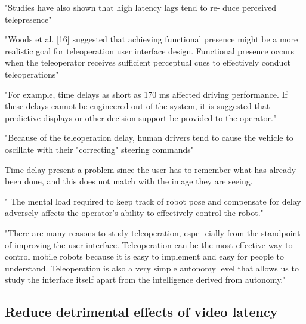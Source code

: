 "Studies have also shown that high latency lags tend to re-
duce perceived telepresence"

"Woods et al. [16] suggested that achieving functional presence might be a more realistic goal for teleoperation user interface design. Functional presence occurs when the teleoperator receives sufficient perceptual cues to effectively conduct teleoperations"

"For example, time delays as short as 170 ms affected driving performance. If these delays cannot be engineered out of the system, it is suggested that predictive displays or other decision support be provided to the operator."

\citep{Appelqvist2007} "Because of the teleoperation delay, human drivers
tend to cause the vehicle to oscillate with their "correcting" steering commands" 

Time delay present a problem since the user has to remember what has already been done, and this does not match with the image they are seeing.

\citep{Ricks2004} " The mental load required to keep track of robot pose and compensate for delay adversely affects the operator's ability to effectively control the robot."

"There are many reasons to study teleoperation, espe-
cially from the standpoint of improving the user interface. Teleoperation can be the most effective way to control mobile robots because it is easy to implement and easy for people to understand. Teleoperation is also a very simple autonomy level that allows us to study the interface itself apart from the intelligence derived from autonomy."

\subsection{Reduce detrimental effects of video latency}

